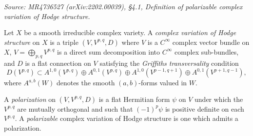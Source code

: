 \begin{definition}
  \label{def:complex-variation}
  \textit{Source: MR4736527 (arXiv:2202.00039), §4.1, Definition of polarizable
  complex variation of Hodge structure.}

  Let \(X\) be a smooth irreducible complex variety. A \emph{complex variation of
  Hodge structure} on \(X\) is a triple \((V, V^{p,q}, D)\) where \(V\) is a
  \(C^\infty\) complex vector bundle on \(X\), \(V = \bigoplus_{p,q} V^{p,q}\) is a
  direct sum decomposition into \(C^\infty\) complex sub-bundles, and \(D\) is a
  flat connection on \(V\) satisfying the \emph{Griffiths transversality}
  condition
  \[
    D(V^{p,q}) \subset A^{1,0}(V^{p,q}) \oplus A^{0,1}(V^{p,q})
    \oplus A^{1,0}(V^{p-1,q+1}) \oplus A^{0,1}(V^{p+1,q-1}),
  \]
  where \(A^{a,b}(W)\) denotes the smooth \((a,b)\)-forms valued in \(W\).

  A \emph{polarization} on \((V, V^{p,q}, D)\) is a flat Hermitian form \(\psi\) on
  \(V\) under which the \(V^{p,q}\) are mutually orthogonal and such that
  \((-1)^p \psi\) is positive definite on each \(V^{p,q}\). A \emph{polarizable}
  complex variation of Hodge structure is one which admits a polarization.


\end{definition}
